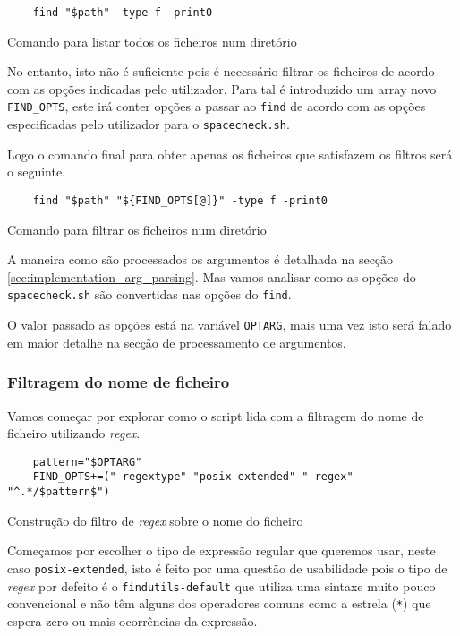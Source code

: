 \begin{listing}[H]
	\centering
	\begin{verbatim}
    find "$path" -type f -print0
  \end{verbatim}
	\caption{Comando para listar todos os ficheiros num diretório}
\end{listing}

No entanto, isto não é suficiente pois é necessário filtrar os ficheiros de
acordo com as opções indicadas pelo utilizador. Para tal é introduzido um array
novo \Verb|FIND_OPTS|, este irá conter opções a passar ao \Verb|find| de acordo
com as opções especificadas pelo utilizador para o \Verb|spacecheck.sh|.

Logo o comando final para obter apenas os ficheiros que satisfazem os filtros
será o seguinte.

\begin{listing}[H]
	\centering
	\begin{verbatim}
    find "$path" "${FIND_OPTS[@]}" -type f -print0
  \end{verbatim}
	\caption{Comando para filtrar os ficheiros num diretório}
\end{listing}

A maneira como são processados os argumentos é detalhada na secção
\ref{sec:implementation_arg_parsing}. Mas vamos analisar como as opções do
\Verb|spacecheck.sh| são convertidas nas opções do \Verb|find|.

O valor passado as opções está na variável \Verb|OPTARG|, mais uma vez isto será
falado em maior detalhe na secção de processamento de argumentos.

\subsubsection{Filtragem do nome de ficheiro}

Vamos começar por explorar como o script lida com a filtragem do nome de
ficheiro utilizando \emph{regex}.

\begin{listing}[H]
	\centering
	\begin{verbatim}
    pattern="$OPTARG"
    FIND_OPTS+=("-regextype" "posix-extended" "-regex" "^.*/$pattern$")
  \end{verbatim}
	\cprotect\caption{Construção do filtro de \emph{regex} sobre o nome do ficheiro}
\end{listing}

Começamos por escolher o tipo de expressão regular que queremos usar, neste
caso \Verb|posix-extended|, isto é feito por uma questão de usabilidade pois o
tipo de \emph{regex} por defeito é o \Verb|findutils-default| que utiliza uma
sintaxe muito pouco convencional e não têm alguns dos operadores comuns
\cite{find_man} como a estrela (\Verb|*|) que espera zero ou mais ocorrências
da expressão.

